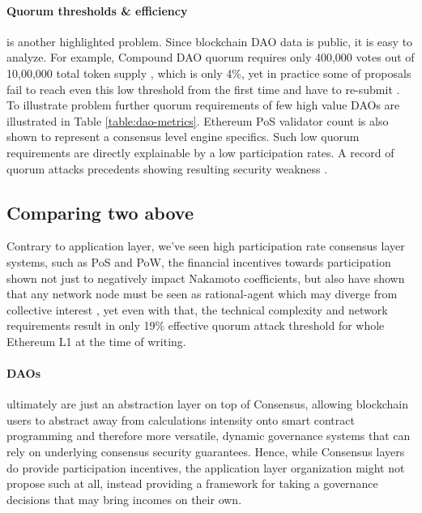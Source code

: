 \documentclass{article}
\begin{document}
\begin{CJK}{UTF8}{gbsn}
\begin{multicols}{2}
        \paragraph{Quorum thresholds \& efficiency} is another highlighted problem. Since blockchain DAO data is public, it is easy to analyze. For example, Compound DAO quorum requires only 400,000 \cite{CompDAO} votes out of 10,00,000 total token supply \cite{CompToken}, which is only 4\%, yet in practice some of proposals fail to reach even this low threshold from the first time and have to re-submit \cite{CompProp232}\cite{CompProp237}. To illustrate problem further quorum requirements of few high value DAOs are illustrated in Table \ref*{table:dao-metrics}. Ethereum PoS validator count is also shown to represent a consensus level engine specifics. Such low quorum requirements are directly explainable by a low participation rates. A record of quorum attacks precedents showing resulting security weakness \cite{AragonBlog}\cite{rhizoo2023}.
        
        \subsection{Comparing two above}
        Contrary to application layer, we've seen high participation rate consensus layer systems, such as PoS and PoW, the financial incentives towards participation shown not just to negatively impact  Nakamoto coefficients, but also have shown that any network node must be seen as rational-agent which may diverge from collective interest \cite{Philip2019}, yet even with that, the technical complexity and network requirements result in only 19\% effective quorum attack threshold for whole Ethereum L1 at the time of writing.

        \paragraph*{DAOs} ultimately are just an abstraction layer on top of Consensus, allowing blockchain users to abstract away from calculations intensity onto smart contract programming and therefore more versatile, dynamic governance systems that can rely on underlying consensus security guarantees. Hence, while Consensus layers do provide participation incentives, the application layer organization might not propose such at all, instead providing a framework for taking a governance decisions that may bring incomes on their own.

\end{multicols}
\end{CJK}
\end{document}

